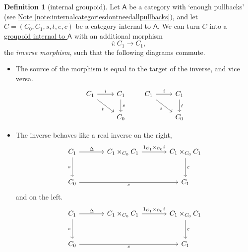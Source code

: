 \documentclass[a4paper]{report}
\newcommand{\defn}[1]{\ul{#1}}
\theoremstyle{definition}
\newtheorem{definition}{Definition}[section]
\theoremstyle{plain}
\theoremstyle{remark}
\begin{document}
\begin{definition}[internal groupoid]
  \label{def:internalgroupoid}
  Let $\mathsf{A}$ be a category with `enough pullbacks' (see \hyperref[note:internalcategoriesdontneedallpullbacks]{Note \ref*{note:internalcategoriesdontneedallpullbacks}}), and let $C = (C_{0}, C_{1}, s, t, e, c)$ be a category internal to $\mathsf{A}$. We can turn $C$ into a \defn{groupoid internal to $\mathsf{A}$} with an additional morphism
  \begin{equation*}
    i\colon C_{1} \to C_{1},
  \end{equation*}
  the \emph{inverse morphism}, such that the following diagrams commute.
  \begin{itemize}
    \item The source of the morphism is equal to the target of the inverse, and vice versa.
      \begin{equation*}
        \begin{tikzcd}
          C_{1}
          \arrow[r, "i"]
          \arrow[rd, swap, "t"]
          & C_{1}
          \arrow[d, "s"]
          \\ 
          & C_{0}
        \end{tikzcd}
        \qquad
        \begin{tikzcd}
          C_{1}
          \arrow[r, "i"]
          \arrow[rd, swap, "s"]
          & C_{1}
          \arrow[d, "t"]
          \\ 
          & C_{0}
        \end{tikzcd}
      \end{equation*}

    \item The inverse behaves like a real inverse on the right,
      \begin{equation*}
        \begin{tikzcd}[column sep=large, row sep=large]
          C_{1}
          \arrow[r, "\Delta"]
          \arrow[d, swap, "s"]
          & C_{1} \times_{C_{0}} C_{1}
          \arrow[r, "1_{C_{1}} \times_{C_{0}} i"]
          & C_{1} \times_{C_{0}} C_{1}
          \arrow[d, "c"]
          \\
          C_{0}
          \arrow[rr, swap, "e"]
          & & C_{1}
        \end{tikzcd}
      \end{equation*}
      and on the left.
      \begin{equation*}
        \begin{tikzcd}[column sep=large, row sep=large]
          C_{1}
          \arrow[r, "\Delta"]
          \arrow[d, swap, "s"]
          & C_{1} \times_{C_{0}} C_{1}
          \arrow[r, "1_{C_{1}} \times_{C_{0}} i"]
          & C_{1} \times_{C_{0}} C_{1}
          \arrow[d, "c"]
          \\
          C_{0}
          \arrow[rr, swap, "e"]
          & & C_{1}
        \end{tikzcd}
      \end{equation*}
  \end{itemize}
\end{definition}
\end{document}
